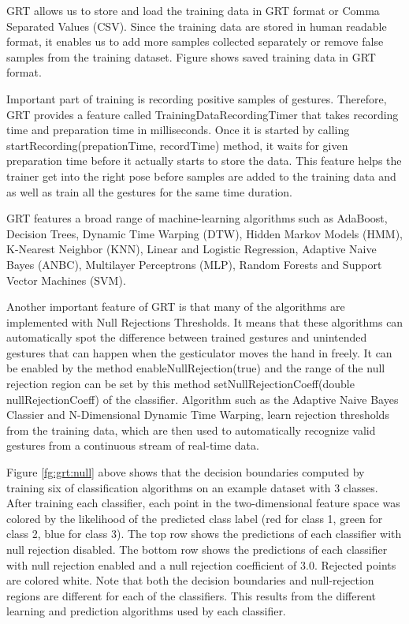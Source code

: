 GRT allows us to store and load the training data in GRT format or Comma Separated Values (CSV). Since the training data are stored in human readable format, it enables us to add more samples collected separately or remove false samples from the training dataset. Figure shows saved training data in GRT format.

Important part of training is recording positive samples of gestures. Therefore, GRT provides a feature called TrainingDataRecordingTimer that takes recording time and preparation time in milliseconds. Once it is started by calling startRecording(prepationTime, recordTime) method, it waits for given preparation time before it actually starts to store the data. This feature helps the trainer get into the right pose before samples are added to the training data and as well as train all the gestures for the same time duration.

GRT features a broad range of machine-learning algorithms such as AdaBoost, Decision Trees, Dynamic Time Warping (DTW), Hidden Markov Models (HMM), K-Nearest Neighbor (KNN), Linear and Logistic Regression, Adaptive Naive Bayes (ANBC), Multilayer Perceptrons (MLP), Random Forests and Support Vector Machines (SVM). 

Another important feature of GRT is that many of the algorithms are implemented with Null Rejections Thresholds. It means that these algorithms can automatically spot the difference between trained gestures and unintended gestures that can happen when the gesticulator moves the hand in freely. It can be enabled by the method enableNullRejection(true) and the range of the null rejection region can be set by this method setNullRejectionCoeff(double nullRejectionCoeff) of the classifier. Algorithm such as the Adaptive Naive Bayes Classier and N-Dimensional Dynamic Time Warping, learn rejection thresholds from the training data, which are then used to automatically recognize valid gestures from a continuous stream of real-time data.



Figure \ref{fg:grt:null} above shows that the decision boundaries computed by training six of classification algorithms on an example dataset with 3 classes. After training each classifier, each point in the two-dimensional feature space was colored by the likelihood of the predicted class label (red for class 1, green for class 2, blue for class 3). The top row shows the predictions of each classifier with null rejection disabled. The bottom row shows the predictions of each classifier with null rejection enabled and a null rejection coefficient of 3.0. Rejected points are colored white. Note that both the decision boundaries and null-rejection regions are different for each of the classifiers. This results from the different learning and prediction algorithms used by each classifier. 

